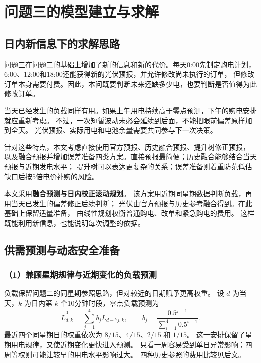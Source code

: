 \section{问题三的模型建立与求解}

\subsection{日内新信息下的求解思路}

问题三在问题二的基础上增加了新的信息和新的代价。每天0:00先制定购电计划，
6:00、12:00和18:00还能获得新的光伏预报，并允许修改尚未执行的订单，
但修改订单本身需要付费。因此，本问既要判断未来还缺多少电，也要判断是否值得为此修改订单。

当天已经发生的负载同样有用。如果上午用电持续高于零点预测，下午的购电安排就应重新考虑。
不过，一次短暂波动未必会延续到后面，不能把眼前偏差原样加到全天。
光伏预报、实际用电和电池余量需要共同参与下一次决策。

针对这些特点，本文考虑直接使用官方预报、历史融合预报、提升树修正预报，
以及融合预报并增加误差准备四类方案。直接预报最简便；历史融合能够结合当天预报与近期发电水平；
提升树可以表达更复杂的关系；误差准备则着重防范低估缺口后按5倍电价补购的风险。

本文采用\textbf{融合预测与日内校正滚动规划}。
该方案用近期同星期数据判断负载，再用当天已发生的偏差修正后续判断；
光伏由官方预报与历史参考融合得到。在此基础上保留适量准备，
由线性规划权衡普通购电、改单和紧急购电的费用。
这样既能利用新信息，也能说明每次调整的依据。

\subsection{供需预测与动态安全准备}

\subsubsection*{（1）兼顾星期规律与近期变化的负载预测}

负载保留问题二的同星期参照思路，但对较近的日期赋予更高权重。
设 $d$ 为当天，$k$ 为日内第 $k$ 个10分钟时段，零点负载预测为
\begin{equation}
\widehat L^{0}_{d,k}
=\sum_{j=1}^{4}b_jL_{d-7j,k},\qquad
b_j=\frac{0.5^{j-1}}{\sum_{i=1}^{4}0.5^{i-1}}.
\end{equation}
最近四个同星期日的权重依次为 $8/15$、$4/15$、$2/15$ 和 $1/15$。
这一安排保留了星期用电规律，又使近期变化更快进入预测。
只看一周容易受到单日异常影响；四周等权则可能让较早的用电水平影响过大。
四种历史参照的费用比较见后文。


